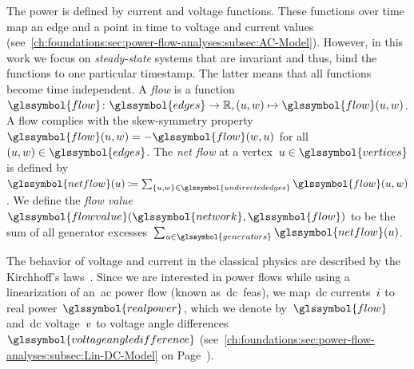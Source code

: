 The power is defined by current and voltage functions. These functions over time
map an edge and a point in time to voltage and current values
(see~\cref{ch:foundations:sec:power-flow-analyses:subsec:AC-Model}). However, in
this work we focus on \emph{steady-state} systems that are invariant and thus,
bind the functions to one particular timestamp. The latter means that all
functions become time independent.
%
A \emph{flow} is a function~$
    \glssymbol{flow}
    \colon
    \glssymbol{edges}
    \to
    \reals,
    (\vertexa,\vertexc)
    \mapsto
    \glssymbol{flow}(\vertexa,\vertexc)
$. A flow complies with the skew-symmetry
property~$
    \glssymbol{flow}(\vertexa,\vertexc) 
    = 
    -\glssymbol{flow}(\vertexc,\vertexa)
$ for all~$(\vertexa,\vertexc)\in\glssymbol{edges}$. The \emph{net flow} at a
vertex~$\vertexa\in\glssymbol{vertices}$ is defined by~$
    \glssymbol{netflow}(\vertexa)
    \coloneqq
    \sum_{
        \{\vertexa,\vertexc\}
        \in
        \glssymbol{undirectededges}
    }
    \glssymbol{flow}(\vertexa,\vertexc)
$. We define the \emph{flow value}~$
    \glssymbol{flowvalue}(\glssymbol{network},\glssymbol{flow})
$ to be the sum of all generator excesses~$
    \sum_{
        \vertexa
        \in
        \glssymbol{generators}
    }
    \glssymbol{netflow}(\vertexa)
$.

The behavior of voltage and current in the classical physics are described by
the Kirchhoff's laws~\parencite{Kir47}\parencite[p.120; Definition 6-1]{Ses61}.
Since we are interested in power flows while using a linearization of
an~\acrshort{ac} power flow (known as~\gls{dc}~\gls{feas}), we map~\gls{dc}
currents~$i$ to real power~$
\glssymbol{realpower}$, which we denote by~$\glssymbol{flow}$
and~\gls{dc} voltage~$v$ to voltage angle
differences~$\glssymbol{voltageangledifference}$ 
(see~\cref{ch:foundations:sec:power-flow-analyses:subsec:Lin-DC-Model} on
Page~\pageref{ch:foundations:sec:power-flow-analyses:analogies-to-the-dc-model}).
% 
